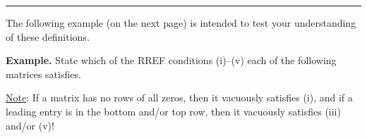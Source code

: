\documentclass[12 pt]{article}
\newcommand{\note}[1]{\ul{Note}: #1}
\begin{document}
\begin{center}\vspace{4.5mm}\rule{3in}{0.75pt}\vspace{3mm}\end{center}

The following example (on the next page) is intended to test your understanding of these definitions.

\newpage

\noindent\textbf{Example.} State which of the RREF conditions (i)--(v) each of the following matrices satisfies. 

\note{If a matrix has no rows of all zeros, then it vacuously satisfies (i), and if a leading entry is in the bottom and/or top row, then it vacuously satisfies (iii) and/or (v)!}\vspace{6mm}
\end{document}
